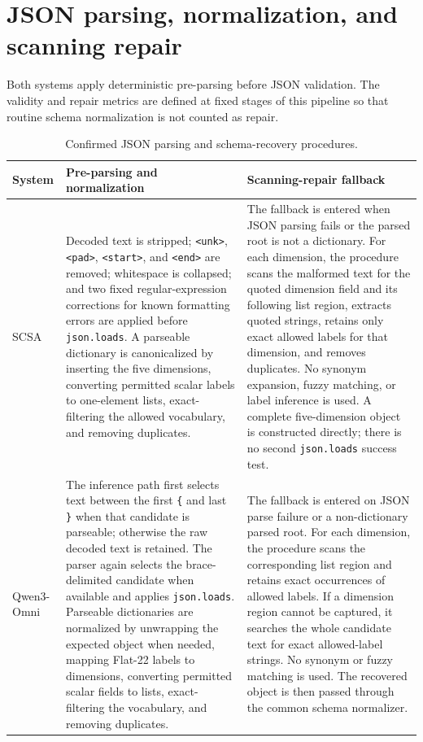 \documentclass[10pt]{article}
\begin{document}
\section{JSON parsing, normalization, and scanning repair}
Both systems apply deterministic pre-parsing before JSON validation. The validity and repair metrics are defined at fixed stages of this pipeline so that routine schema normalization is not counted as repair.

\begin{table}[h]
\centering
\caption{Confirmed JSON parsing and schema-recovery procedures.}
\label{tab:json_repair}
\scriptsize
\begin{tabular}{p{}p{}p{}}
\toprule
System & Pre-parsing and normalization & Scanning-repair fallback \\
\midrule
SCSA &
Decoded text is stripped; \texttt{<unk>}, \texttt{<pad>}, \texttt{<start>}, and \texttt{<end>} are removed; whitespace is collapsed; and two fixed regular-expression corrections for known formatting errors are applied before \texttt{json.loads}. A parseable dictionary is canonicalized by inserting the five dimensions, converting permitted scalar labels to one-element lists, exact-filtering the allowed vocabulary, and removing duplicates. &
The fallback is entered when JSON parsing fails or the parsed root is not a dictionary. For each dimension, the procedure scans the malformed text for the quoted dimension field and its following list region, extracts quoted strings, retains only exact allowed labels for that dimension, and removes duplicates. No synonym expansion, fuzzy matching, or label inference is used. A complete five-dimension object is constructed directly; there is no second \texttt{json.loads} success test. \\

Qwen3-Omni &
The inference path first selects text between the first \texttt{\{} and last \texttt{\}} when that candidate is parseable; otherwise the raw decoded text is retained. The parser again selects the brace-delimited candidate when available and applies \texttt{json.loads}. Parseable dictionaries are normalized by unwrapping the expected object when needed, mapping Flat-22 labels to dimensions, converting permitted scalar fields to lists, exact-filtering the vocabulary, and removing duplicates. &
The fallback is entered on JSON parse failure or a non-dictionary parsed root. For each dimension, the procedure scans the corresponding list region and retains exact occurrences of allowed labels. If a dimension region cannot be captured, it searches the whole candidate text for exact allowed-label strings. No synonym or fuzzy matching is used. The recovered object is then passed through the common schema normalizer. \\
\bottomrule
\end{tabular}
\end{table}
\end{document}
